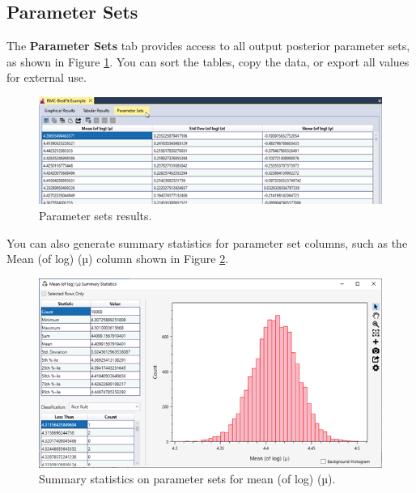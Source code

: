 \documentclass[
]{book}
\begin{document}
\hypertarget{parameter-sets}{%
\subsection{Parameter Sets}\label{parameter-sets}}

The \textbf{Parameter Sets} tab provides access to all output posterior parameter sets, as shown in Figure \ref{fig:figure-58}. You can sort the tables, copy the data, or export all values for external use.

\begin{figure}

{\centering \includegraphics{images/figure58} 

}

\caption{Parameter sets results.}\label{fig:figure-58}
\end{figure}

You can also generate summary statistics for parameter set columns, such as the Mean (of log) (µ) column shown in Figure \ref{fig:figure-59}.

\begin{figure}

{\centering \includegraphics{images/figure59} 

}

\caption{Summary statistics on parameter sets for mean (of log) (µ).}\label{fig:figure-59}
\end{figure}
\end{document}
